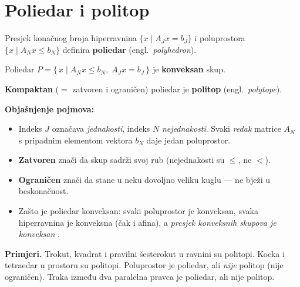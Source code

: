 \section{Poliedar i politop}
\label{sec:poliedar}

\begin{definicija}
Presjek konačnog broja hiperravnina $\{x \mid A_Jx = b_J\}$ i poluprostora
$\{x \mid A_Nx \le b_N\}$ definira \textbf{poliedar} (engl.\ \emph{polyhedron}).

Poliedar $P = \{\, x \mid A_Nx \le b_N,\; A_Jx = b_J \,\}$ je
\textbf{konveksan} skup.

\textbf{Kompaktan} ($=$ zatvoren i ograničen) poliedar je \textbf{politop}
(engl.\ \emph{polytope}).
\end{definicija}

\textbf{Objašnjenje pojmova:}
\begin{itemize}
  \item Indeks $J$ označava \emph{jednakosti}, indeks $N$ \emph{nejednakosti}.
        Svaki \emph{redak} matrice $A_N$ s pripadnim elementom vektora $b_N$
        daje jedan poluprostor.
  \item \textbf{Zatvoren} znači da skup sadrži svoj rub (nejednakosti su
        $\le$, ne $<$).
  \item \textbf{Ograničen} znači da stane u neku dovoljno veliku kuglu --- ne
        bježi u beskonačnost.
  \item Zašto je poliedar konveksan: svaki poluprostor je konveksan, svaka
        hiperravnina je konveksna (čak i afina), a \emph{presjek konveksnih
        skupova je konveksan} .
\end{itemize}

\textbf{Primjeri.} Trokut, kvadrat i pravilni šesterokut u ravnini su politopi.
Kocka i tetraedar u prostoru su politopi. Poluprostor je poliedar, ali
\emph{nije} politop (nije ograničen). Traka između dva paralelna pravca je
poliedar, ali nije politop.

